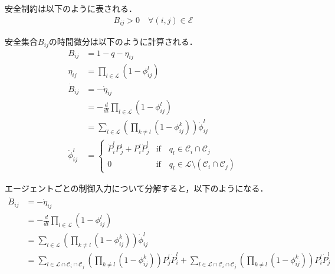 安全制約は以下のように表される．
\begin{equation}
\begin{aligned}
B_{ij} > 0 \quad \forall (i,j) \in \mathcal{E}
\label{eq:safe_constraint_edge}
\end{aligned}
\end{equation}

安全集合$B_{ij}$の時間微分は以下のように計算される．
\begin{equation}
\begin{aligned}
B_{ij} &= 1-q-\eta_{ij} \\
\eta_{ij} &= \prod_{l\in\mathcal{L}}(1-\phi_{ij}^l) \\
\dot{B}_{ij} &= -\dot{\eta}_{ij} \\
&= -\frac{d}{dt}\prod_{l\in\mathcal{L}}(1-\phi_{ij}^l) \\
&= \sum_{l\in \mathcal{L}}(\prod_{k\neq l}(1-\phi_{ij}^k))\dot{\phi}^l_{ij} \\
\dot{\phi}^l_{ij} &= \left\{ \begin{array}{ll}
\dot{P}_i^l P_j^l + P_i^l \dot{P}_j^l & \mathrm{if} \quad q_l\in\mathcal{C}_i \cap \mathcal{C}_j \\
0 & \mathrm{if} \quad q_l\in \mathcal{L}\setminus(\mathcal{C}_i \cap \mathcal{C}_j)
\end{array} \right.
\label{eq:safe_set_derivative_edge}
\end{aligned}
\end{equation}

エージェントごとの制御入力について分解すると，以下のようになる．
\begin{equation}
\begin{aligned}
\dot{B}_{ij} &= -\dot{\eta}_{ij} \\
&= -\frac{d}{dt}\prod_{l\in\mathcal{L}}(1-\phi_{ij}^l) \\
&= \sum_{l\in \mathcal{L}}(\prod_{k\neq l}(1-\phi_{ij}^k))\dot{\phi}^l_{ij} \\
&= \sum_{l\in \mathcal{L}\cap\mathcal{C}_i \cap \mathcal{C}_j}(\prod_{k\neq l}(1-\phi_{ij}^k))P_j^l\dot{P}_i^l + \sum_{l\in \mathcal{L}\cap\mathcal{C}_i \cap \mathcal{C}_j}(\prod_{k\neq l}(1-\phi_{ij}^k))P_i^l\dot{P}_j^l
\label{eq:safe_set_derivative_edge_decomposed}
\end{aligned}
\end{equation}

